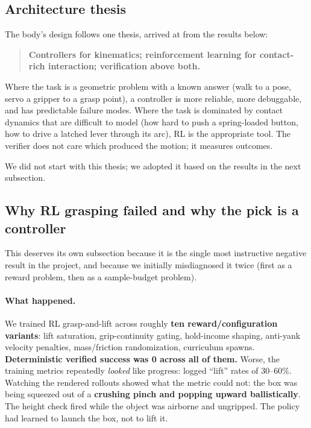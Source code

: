 \documentclass[11pt]{article}
\begin{document}
\subsection{Architecture thesis}

The body's design follows one thesis, arrived at from the results below:
\begin{quote}
\textbf{Controllers for kinematics; reinforcement learning for contact-rich interaction; verification above both.}
\end{quote}
Where the task is a geometric problem with a known answer (walk to a pose, servo a gripper to a grasp point), a controller is more reliable, more debuggable, and has predictable failure modes. Where the task is dominated by contact dynamics that are difficult to model (how hard to push a spring-loaded button, how to drive a latched lever through its arc), RL is the appropriate tool. The verifier does not care which produced the motion; it measures outcomes.

We did not start with this thesis; we adopted it based on the results in the next subsection.

\subsection{Why RL grasping failed and why the pick is a controller}
\label{sec:graspfail}

This deserves its own subsection because it is the single most instructive negative result in the project, and because we initially misdiagnosed it twice (first as a reward problem, then as a sample-budget problem).

\paragraph{What happened.} We trained RL grasp-and-lift across roughly \textbf{ten reward/configuration variants}: lift saturation, grip-continuity gating, hold-income shaping, anti-yank velocity penalties, mass/friction randomization, curriculum spawns. \textbf{Deterministic verified success was 0 across all of them.} Worse, the training metrics repeatedly \emph{looked} like progress: logged ``lift'' rates of 30--60\%. Watching the rendered rollouts showed what the metric could not: the box was being squeezed out of a \textbf{crushing pinch and popping upward ballistically}. The height check fired while the object was airborne and ungripped. The policy had learned to launch the box, not to lift it.
\end{document}
